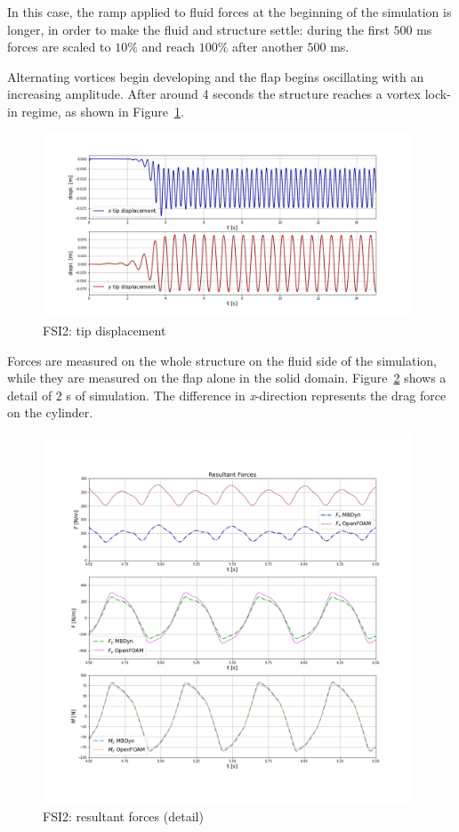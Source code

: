 In this case, the ramp applied to fluid forces at the beginning of the simulation is longer, in order to make the fluid and structure settle: during the first $500$ \si{ms} forces are scaled to $10\%$ and reach $100\%$ after another $500$ \si{ms}.

Alternating vortices begin developing and the flap begins oscillating with an increasing amplitude. After around 4 seconds the structure reaches a vortex lock-in regime, as shown in Figure~\ref{fig:FSI2_displacement}.


\begin{figure}[htbp!]
	\centering
	\includegraphics[width=0.98\textwidth, trim=20 20 50 50, clip]{images/FSI2/disp_fsi2.png}
	\caption{FSI2: tip displacement}
	\label{fig:FSI2_displacement}
\end{figure}

Forces are measured on the whole structure on the fluid side of the simulation, while they are measured on the flap alone in the solid domain. Figure~\ref{fig:FSI2_force} shows a detail of $2$ \si{s} of simulation. The difference in \textit{x}-direction represents the drag force on the cylinder.

\begin{figure}[htbp!]
	\centering
	\includegraphics[width=0.98\textwidth, trim=20 100 20 100, clip]{images/FSI2/forces_fsi2.png}
	\caption{FSI2: resultant forces (detail)}
	\label{fig:FSI2_force}
\end{figure}


